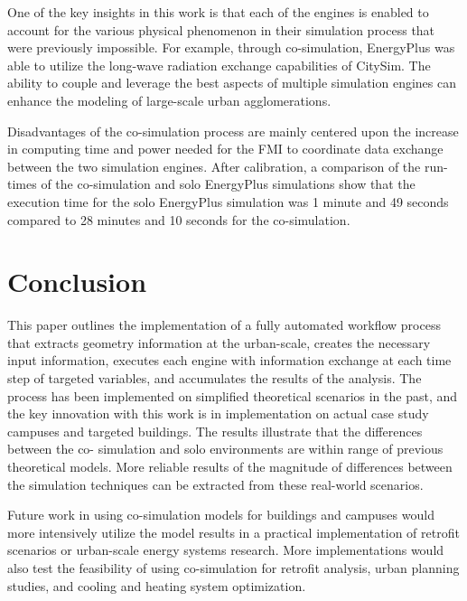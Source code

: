 \documentclass{tBPS2e}
\theoremstyle{plain}
\theoremstyle{definition}
\theoremstyle{remark}
\begin{document}

One of the key insights in this work is that each of the engines is enabled to account for the various 
physical phenomenon in their simulation process that were previously impossible. For example, 
through co-simulation, EnergyPlus was able to utilize the long-wave radiation exchange capabilities 
of CitySim. The ability to couple and leverage the best aspects of multiple simulation
engines can enhance the modeling of large-scale urban agglomerations. 

Disadvantages of the co-simulation process are mainly centered upon the increase
in computing time and power needed for the FMI to coordinate data exchange between 
the two simulation engines. After calibration, a comparison of the run-times of the co-simulation and solo EnergyPlus
simulations show that the execution time for the solo EnergyPlus simulation was 1 minute and 49 seconds compared to 28 minutes and 10 seconds for the co-simulation. 

\section{Conclusion}
This paper outlines the implementation of a fully automated workflow
process that extracts geometry information at the
urban-scale, creates the necessary input information, executes each engine
with information exchange at each time step of targeted variables, and
accumulates the results of the analysis. The process has been implemented on
simplified theoretical scenarios in the past, and the key innovation with this
work is in implementation on actual case study campuses and targeted
buildings. The results illustrate that the differences between the co-
simulation and solo environments are within range of previous theoretical
models. More reliable results of the magnitude of differences between the
simulation techniques can be extracted from these real-world scenarios. 

Future work in using co-simulation models for buildings and campuses would
more intensively utilize the model results in a practical implementation of
retrofit scenarios or urban-scale energy systems research. More implementations would 
also test the feasibility of using co-simulation for retrofit analysis, urban planning studies, and
cooling and heating system optimization.
\end{document}
